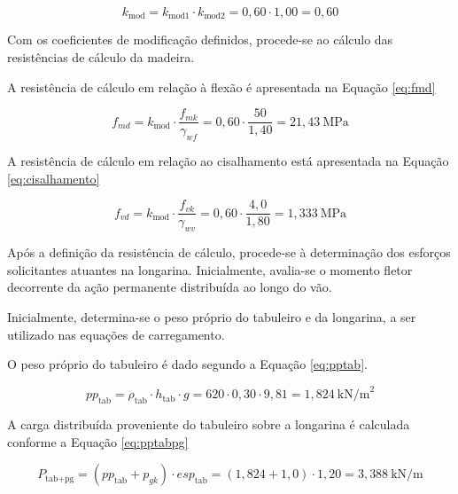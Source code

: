 \begin{equation}
k_{\text{mod}} = k_{\text{mod1}} \cdot k_{\text{mod2}} 
               = 0{,}60 \cdot 1{,}00 
               = 0{,}60
\label{eq:4.6}
\end{equation}

Com os coeficientes de modificação definidos, procede-se ao cálculo das resistências de cálculo da madeira. 

A resistência de cálculo em relação à flexão é apresentada na Equação \eqref{eq:fmd}

\begin{equation}
f_{md} = k_{\text{mod}} \cdot \frac{f_{mk}}{\gamma_{wf}}
       = 0{,}60 \cdot \frac{50}{1{,}40}
       = 21{,}43\ \text{MPa}
\label{eq:fmd}
\end{equation}

A resistência de cálculo em relação ao cisalhamento está apresentada na Equação \eqref{eq:cisalhamento}

\begin{equation}
f_{vd} = k_{\text{mod}} \cdot \frac{f_{vk}}{\gamma_{wv}}
       = 0{,}60 \cdot \frac{4{,}0}{1{,}80}
       = 1{,}333\ \text{MPa}
\label{eq:cisalhamento}       
\end{equation}

Após a definição da resistência de cálculo, procede-se à determinação dos esforços solicitantes atuantes na longarina. Inicialmente, avalia-se o momento fletor decorrente da ação permanente distribuída ao longo do vão.

Inicialmente, determina-se o peso próprio do tabuleiro e da longarina, a ser utilizado nas equações de carregamento.

O peso próprio do tabuleiro é dado segundo a Equação \eqref{eq:pptab}.

\begin{equation}
pp_{\text{tab}} = \rho_{\text{tab}} \cdot h_{\text{tab}} \cdot g
               = 620 \cdot 0{,}30 \cdot 9{,}81
               = 1{,}824\ \text{kN/m}^2
\label{eq:pptab}               
\end{equation}

A carga distribuída proveniente do tabuleiro sobre a longarina é calculada conforme a Equação \eqref{eq:pptabpg}

\begin{equation}
P_{\text{tab+pg}} = (pp_{\text{tab}} + p_{gk}) \cdot esp_{\text{tab}}
                  = (1{,}824 + 1{,}0) \cdot 1{,}20
                  = 3{,}388\ \text{kN/m}
\label{eq:pptabpg}                  
\end{equation}

